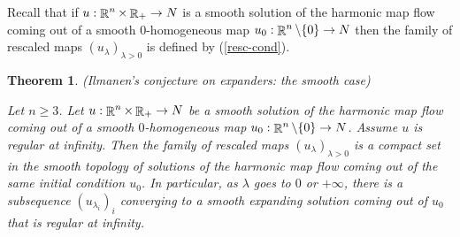 \documentclass[a4paper,11pt,reqno]{amsart}
\newtheorem{theo}[defn]{Theorem}
\def\R{\mathop{\rm \mathbb{R}}\nolimits}
\begin{document}
Recall that if $u:\R^n\times\R_+\rightarrow N$ is a smooth solution of the harmonic map flow coming out of a smooth $0$-homogeneous map $u_0:\R^n\setminus\{0\}\rightarrow N$ then the family of rescaled maps $(u_{\lambda})_{\lambda>0}$ is defined by (\ref{resc-cond}).
\begin{theo}(Ilmanen's conjecture on expanders: the smooth case)\label{ilmanen-smooth-conj}

Let $n\geq 3$. 
Let $u:\R^n\times\R_+\rightarrow N$ be a smooth solution of the harmonic map flow coming out of a smooth $0$-homogeneous map $u_0:\R^n\setminus\{0\}\rightarrow N$. Assume $u$ is regular at infinity. Then the family of rescaled maps $(u_{\lambda})_{\lambda>0}$ is a compact set in the smooth topology of solutions of the harmonic map flow coming out of the same initial condition $u_0$. In particular, as $ \lambda$ goes to $0$ or $+\infty$, there is a subsequence $(u_{\lambda_i})_i$ converging to a smooth expanding solution coming out of $u_0$ that is regular at infinity. 
\end{theo}
\end{document}
